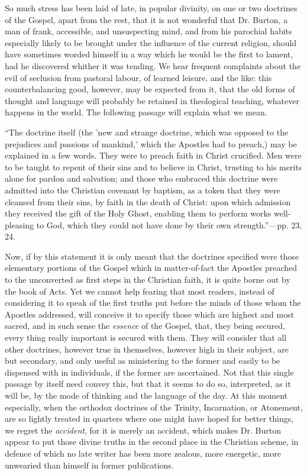 So much
stress has been laid of late, in popular divinity, on one or two
doctrines of the Gospel, apart from the rest, that it is not wonderful
that Dr. Burton, a man of frank, accessible, and unsuspecting mind, and
from his parochial habits especially likely to be brought under the
influence of the current religion, should have sometimes worded himself
in a way which he would be the first to lament, had he discovered
whither it was tending. We hear frequent complaints about the evil of
seclusion from pastoral labour, of learned leisure, and the like: this
counterbalancing good, however, may be expected from it, that the old
forms of thought and language will probably be retained in theological
teaching, whatever happens in the world. The following passage will
explain what we mean.

``The
doctrine itself (the 'new and strange doctrine, which was opposed to
the prejudices and passions of mankind,' which the Apostles had to
preach,) may be explained in a few words. They were to preach faith in
Christ crucified. Men were to be taught to repent of their sins and to
believe in Christ, trusting to his merits alone for pardon and
salvation; and those who embraced this doctrine were admitted into the
Christian covenant by baptism, as a token that they were cleansed from
their sins, by faith in the death of Christ: upon which admission they
received the gift of the Holy Ghost, enabling them to perform works
well-pleasing to God, which they could not have done by their own
strength.''—pp. 23, 24.

Now, if by
this statement it is only meant that the doctrines specified were those
elementary portions of the Gospel which in matter-of-fact the Apostles
preached to the unconverted as first steps in the Christian faith, it is
quite borne out by the book of Acts. Yet we cannot help fearing that
most readers, instead of considering it to speak of the first truths put
before the minds of those whom the Apostles addressed, will conceive it
to specify those which are highest and most sacred, and in such sense
the \emph{essence} of the Gospel, that, they being secured, every thing
really important is secured with them. They will consider that all other
doctrines, however true in themselves, however high in their subject,
are but secondary, and only useful as ministering to the former and
easily to be dispensed with in individuals, if the former are
ascertained. Not that this single passage by itself need convey this,
but that it seems to do so, interpreted, as it will be, by the mode of
thinking and the language of the day. At this moment especially, when
the orthodox doctrines of the Trinity, Incarnation, or Atonement, are so
lightly treated in quarters where one might have hoped for better
things, we regret the \emph{accident}, for it is merely an accident,
which makes Dr. Burton appear to put those divine truths in the
second place in the Christian scheme, in defence of which no late writer
has been more zealous, more energetic, more unwearied than himself in
former publications.

